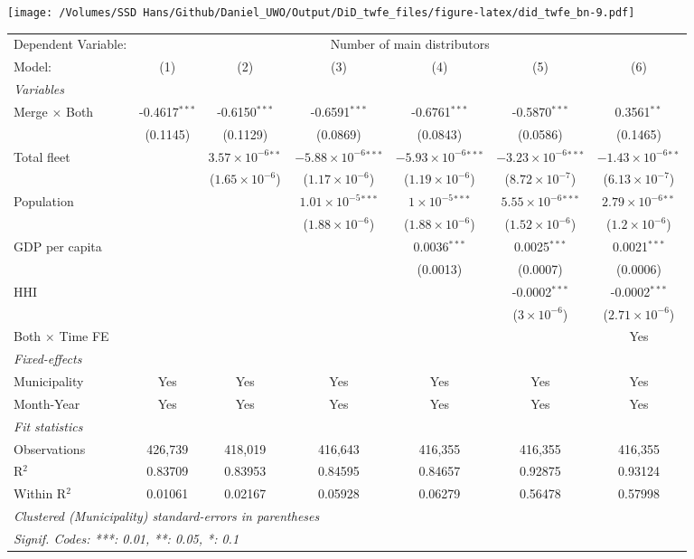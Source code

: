 \documentclass[
]{article}
\begin{document}
\texttt{[image: /Volumes/SSD Hans/Github/Daniel\_UWO/Output/DiD\_twfe\_files/figure-latex/did\_twfe\_bn-9.pdf]}

\begin{tabular}{lcccccc}
\tabularnewline\midrule\midrule
Dependent Variable:&\multicolumn{6}{c}{Number of main distributors}\\
Model:&(1) & (2) & (3) & (4) & (5) & (6)\\
\midrule \emph{Variables}&   &   &   &   &   &  \\
Merge $\times $ Both & -0.4617$^{***}$ & -0.6150$^{***}$ & -0.6591$^{***}$ & -0.6761$^{***}$ & -0.5870$^{***}$ & 0.3561$^{**}$\\
  &(0.1145) & (0.1129) & (0.0869) & (0.0843) & (0.0586) & (0.1465)\\
Total fleet &    & $3.57\times 10^{-6}$$^{**}$ & $-5.88\times 10^{-6}$$^{***}$ & $-5.93\times 10^{-6}$$^{***}$ & $-3.23\times 10^{-6}$$^{***}$ & $-1.43\times 10^{-6}$$^{**}$\\
  &   & ($1.65\times 10^{-6}$) & ($1.17\times 10^{-6}$) & ($1.19\times 10^{-6}$) & ($8.72\times 10^{-7}$) & ($6.13\times 10^{-7}$)\\
Population &    &    & $1.01\times 10^{-5}$$^{***}$ & $1\times 10^{-5}$$^{***}$ & $5.55\times 10^{-6}$$^{***}$ & $2.79\times 10^{-6}$$^{**}$\\
  &   &    & ($1.88\times 10^{-6}$) & ($1.88\times 10^{-6}$) & ($1.52\times 10^{-6}$) & ($1.2\times 10^{-6}$)\\
GDP per capita &    &    &    & 0.0036$^{***}$ & 0.0025$^{***}$ & 0.0021$^{***}$\\
  &   &    &    & (0.0013) & (0.0007) & (0.0006)\\
HHI &    &    &    &    & -0.0002$^{***}$ & -0.0002$^{***}$\\
  &   &    &    &    & ($3\times 10^{-6}$) & ($2.71\times 10^{-6}$)\\
Both $\times$ Time FE &  &  &  &  &  & Yes\\
\midrule \emph{Fixed-effects}&   &   &   &   &   &  \\
Municipality & Yes & Yes & Yes & Yes & Yes & Yes\\
Month-Year & Yes & Yes & Yes & Yes & Yes & Yes\\
\midrule \emph{Fit statistics}&  & & & & & \\
Observations & 426,739&418,019&416,643&416,355&416,355&416,355\\
R$^2$ & 0.83709&0.83953&0.84595&0.84657&0.92875&0.93124\\
Within R$^2$ & 0.01061&0.02167&0.05928&0.06279&0.56478&0.57998\\
\midrule\midrule\multicolumn{7}{l}{\emph{Clustered (Municipality) standard-errors in parentheses}}\\
\multicolumn{7}{l}{\emph{Signif. Codes: ***: 0.01, **: 0.05, *: 0.1}}\\
\end{tabular}
\end{document}
